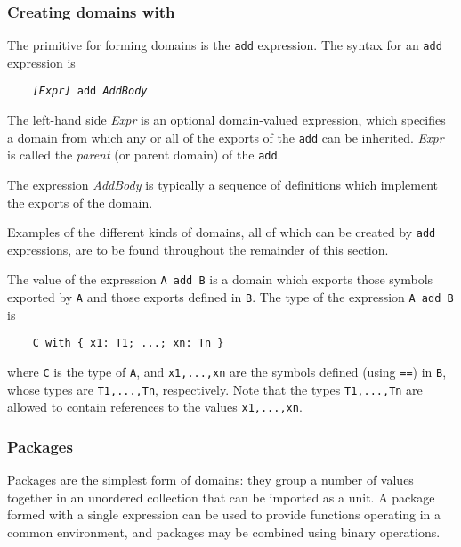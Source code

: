 \subsubsection{Creating domains with }

The primitive for forming domains is the \verb"add" expression.
The syntax for an \verb"add" expression is

\verb"    "{\tt {\em [Expr]\/} add {\em AddBody}}

The left-hand side {\em Expr} is an optional domain-valued expression,
which specifies a domain from which any or all of the exports
of the \verb"add" can be inherited.  {\em Expr} is called the
{\em parent} (or parent domain) of the \verb"add".

The expression {\em AddBody} is typically a sequence of
definitions which implement the exports of the domain.

Examples of the different kinds of domains, all of which can be created
by \verb"add" expressions, are to be found throughout the remainder of
this section.

The value of the expression \verb"A add B" is a domain which exports those
symbols exported by \verb"A" and those exports defined in \verb"B".
The type of the expression \verb"A add B" is

\begin{small}
\begin{verbatim}
    C with { x1: T1; ...; xn: Tn }
\end{verbatim}
\end{small}

where \verb"C" is the type of \verb"A", and
\verb"x1,...,xn" are the symbols defined (using \verb"==") in \verb"B",
whose types are \verb"T1,...,Tn", respectively.
Note that the types \verb"T1,...,Tn" are allowed to contain
references to the values \verb"x1,...,xn".

\subsubsection{Packages}

Packages are the simplest form of domains:  they group a number of
values together in an unordered collection that can be imported as a
unit.  A package formed with a single  expression can be used
to provide functions operating in a common environment, and packages may
be combined using binary  operations.

